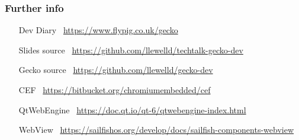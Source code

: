\documentclass[
	notes=none,
	aspectratio=169
]{beamer}
\begin{document}

\begin{frame}[fragile]
\frametitle{Further info}
\setlength{\leftmargini}{7.5em}
\vspace{1.0cm}

\begin{itemize}
\setlength{\parskip}{1.0em}
\item[Dev Diary \,] \url{https://www.flypig.co.uk/gecko}
\item[Slides source \,] \url{https://github.com/llewelld/techtalk-gecko-dev}
\item[Gecko source \,] \url{https://github.com/llewelld/gecko-dev}
\item[CEF \,] \url{https://bitbucket.org/chromiumembedded/cef}
\item[QtWebEngine \,] \url{https://doc.qt.io/qt-6/qtwebengine-index.html}
\item[WebView \,] \url{https://sailfishos.org/develop/docs/sailfish-components-webview}
\end{itemize}

\end{frame}
\note{
\fontsize{7pt}{8pt}{}

}

\end{document}
